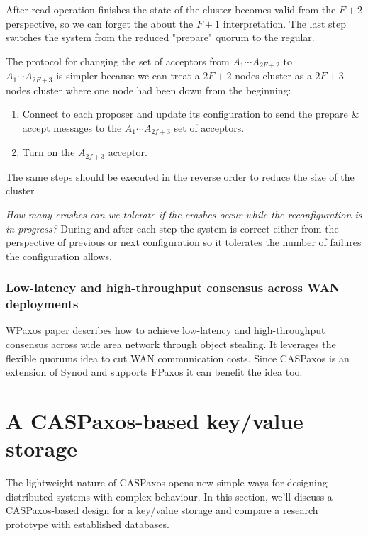 \documentclass[12pt]{article}
\theoremstyle{definition}
\begin{document}
After read operation finishes the state of the cluster becomes valid from the $F+2$ perspective, so we can forget the about the $F+1$ interpretation. The last step switches the system from the reduced "prepare" quorum to the regular.

The protocol for changing the set of acceptors from $A_1 \cdots A_{2F+2}$ to \\
$A_1 \cdots A_{2F+3}$ is simpler because we can treat a $2F+2$ nodes cluster as a $2F+3$ nodes cluster where one node had been down from the beginning:
\begin{enumerate}
  \item Connect to each proposer and update its configuration to send the prepare \& accept messages to the $A_1 \cdots A_{2f+3}$ set of acceptors.
  \item Turn on the $A_{2f+3}$ acceptor.
\end{enumerate}

The same steps should be executed in the reverse order to reduce the size of the cluster

{\it How many crashes can we tolerate if the crashes occur while the reconfiguration is in progress?} During and after each step the system is correct either from the perspective of previous or next configuration so it tolerates the number of failures the configuration allows.

\subsubsection{Low-latency and high-throughput consensus across WAN deployments}

WPaxos\cite{wpaxos} paper describes how to achieve low-latency and high-throughput consensus across wide area network through object stealing. It leverages the flexible quorums\cite{fpaxos} idea to cut WAN communication costs. Since CASPaxos is an extension of Synod and supports FPaxos it can benefit the idea too.

\section{A CASPaxos-based key/value storage}

The lightweight nature of CASPaxos opens new simple ways for designing distributed systems with complex behaviour. In this section, we'll discuss a CASPaxos-based design for a key/value storage and compare a research prototype with established databases.
\end{document}
